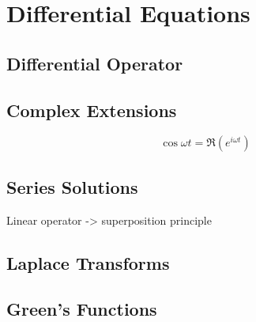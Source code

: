 \chapter{Differential Equations}\label{ch:diffeq}

\section{Differential Operator}
\section{Complex Extensions}
\[\cos\omega t = \Re(e^{i\omega t})\] 

\section{Series Solutions}
Linear operator -> superposition principle
\section{Laplace Transforms}

\section{Green's Functions}

